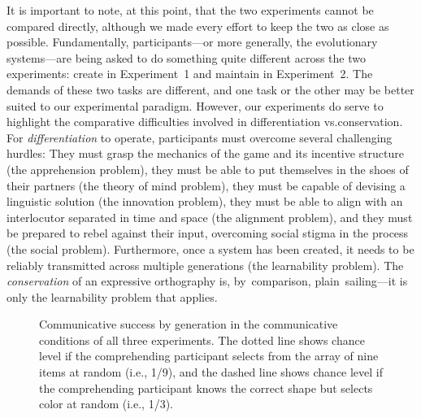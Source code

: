 \documentclass[doc,biblatex]{apa7}
\begin{document}
It is important to note, at this point, that the two experiments cannot be compared directly, although we made every effort to keep the two as close as possible. Fundamentally, participants---or more generally, the evolutionary systems---are being asked to do something quite different across the two experiments: create in Experiment~1 and maintain in Experiment~2. The demands of these two tasks are different, and one task or the other may be better suited to our experimental paradigm. However, our experiments do serve to highlight the comparative difficulties involved in differentiation vs.\@ conservation. For \textit{differentiation} to operate, participants must overcome several challenging hurdles: They must grasp the mechanics of the game and its incentive structure (the apprehension problem), they must be able to put themselves in the shoes of their partners (the theory of mind problem), they must be capable of devising a linguistic solution (the innovation problem), they must be able to align with an interlocutor separated in time and space (the alignment problem), and they must be prepared to rebel against their input, overcoming social stigma in the process (the social problem). Furthermore, once a system has been created, it needs to be reliably transmitted across multiple generations (the learnability problem). The \textit{conservation} of an expressive orthography is, by~comparison, plain~sailing---it is only the learnability problem that applies.

	\begin{figure}
	\vspace*{2pt}
	\caption{Communicative success by generation in the communicative conditions of all three experiments. The dotted line shows chance level if the comprehending participant selects from the array of nine items at random (i.e., 1/9), and the dashed line shows chance level if the comprehending participant knows the correct shape but selects color at random (i.e., 1/3).}
	\label{fig12}
	\end{figure}
\end{document}
